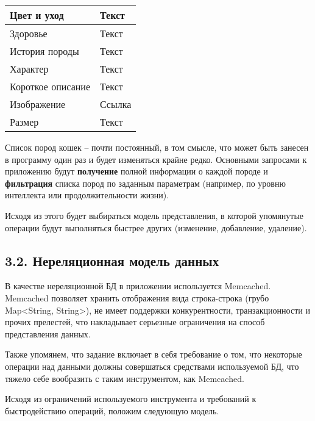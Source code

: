 \begin{longtable}{|p{7.5cm}|p{7.5cm}|}
    Цвет и уход                      & Текст                                              \\\hline
    Здоровье                         & Текст                                              \\\hline
    История породы                   & Текст                                              \\\hline
    Характер                         & Текст                                              \\\hline
    Короткое описание                & Текст                                              \\\hline
    Изображение                      & Ссылка                                             \\\hline
    Размер                           & Текст                                              \\\hline
\end{longtable}

Список пород кошек -- почти постоянный, в том смысле, что может быть занесен в программу один раз и будет изменяться
крайне редко. Основными запросами к приложению будут \textbf{получение} полной информации о каждой породе и \textbf{фильтрация}
списка пород по заданным параметрам (например, по уровню интеллекта или продолжительности жизни).

Исходя из этого будет выбираться модель представления, в которой упомянутые операции будут выполняться быстрее других
(изменение, добавление, удаление).

\subsection*{3.2. Нереляционная модель данных}
В качестве нереляционной БД в приложении используется Memcached. Memcached позволяет хранить отображения вида
строка-строка (грубо Map<String, String>), не имеет поддержки конкурентности, транзакционности и прочих прелестей, что
накладывает серьезные ограничения на способ представления данных.

Также упомянем, что задание включает в себя требование о том, что некоторые операции над данными должны совершаться
средствами используемой БД, что тяжело себе вообразить с таким инструментом, как Memcached.

Исходя из ограничений используемого инструмента и требований к быстродействию операций, положим следующую
модель.

